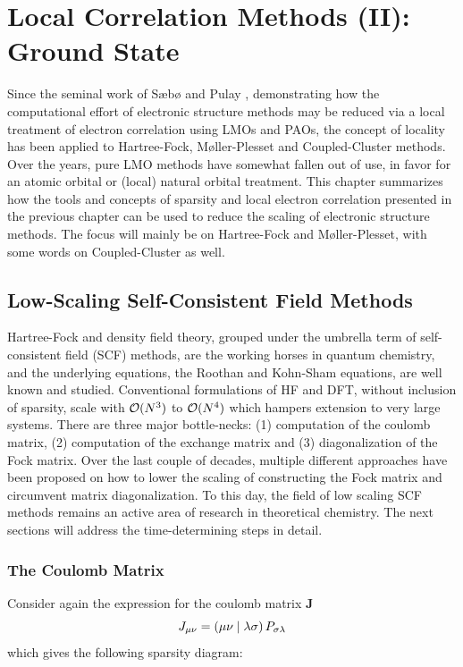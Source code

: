 \chapter{Local Correlation Methods (II): Ground State \label{cha:LOCAL1}}

Since the seminal work of S{\ae}b{\o} and Pulay \cite{Pul1983,Sae1985,Sae1993}, demonstrating how the computational effort of electronic structure methods may be reduced via a local treatment of electron correlation using LMOs and PAOs, the concept of locality has been applied to Hartree-Fock, M{\o}ller-Plesset and Coupled-Cluster methods. Over the years, pure LMO methods have somewhat fallen out of use, in favor for an atomic orbital or (local) natural orbital treatment. This chapter summarizes how the tools and concepts of sparsity and local electron correlation presented in the previous chapter can be used to reduce the scaling of electronic structure methods. The focus will mainly be on Hartree-Fock and M{\o}ller-Plesset, with some words on Coupled-Cluster as well.

\section{Low-Scaling Self-Consistent Field Methods}

Hartree-Fock and density field theory, grouped under the umbrella term of self-consistent field (SCF) methods, are the working horses in quantum chemistry, and the underlying equations, the Roothan and Kohn-Sham equations, are well known and studied. Conventional formulations of HF and DFT, without inclusion of sparsity, scale with $\mathcal{O}(N^{3})$ to $\mathcal{O}(N^{4})$ which hampers extension to very large systems. There are three major bottle-necks: (1) computation of the coulomb matrix, (2) computation of the exchange matrix and (3) diagonalization of the Fock matrix. Over the last couple of decades, multiple different approaches have been proposed on how to lower the scaling of constructing the Fock matrix and circumvent matrix diagonalization. To this day, the field of low scaling SCF methods remains an active area of research in theoretical chemistry. The next sections will address the time-determining steps in detail.

\subsection{The Coulomb Matrix}

Consider again the expression for the coulomb matrix $\mathbf{J}$ 
\begin{equation}
J_{\mu\nu} = \left( \mu\nu \mid \lambda\sigma \right) P_{\sigma\lambda}
\end{equation}
\noindent which gives the following sparsity diagram:

